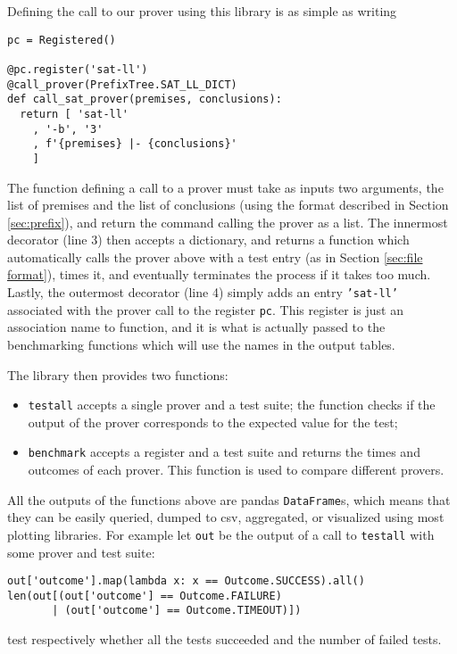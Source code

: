 Defining the call to our prover using this library is as simple as writing
\begin{verbatim}
pc = Registered()

@pc.register('sat-ll')
@call_prover(PrefixTree.SAT_LL_DICT)
def call_sat_prover(premises, conclusions):
  return [ 'sat-ll'
    , '-b', '3'
    , f'{premises} |- {conclusions}'
    ]
\end{verbatim}
The function defining a call to a prover must take as inputs two arguments, the list of premises and the list of conclusions (using the format described in Section \ref{sec:prefix}), and return the command calling the prover as a list.
The innermost decorator (line 3) then accepts a dictionary, and returns a function which automatically calls the prover above with a test entry (as in Section \ref{sec:file format}), times it, and eventually terminates the process if it takes too much.
Lastly, the outermost decorator (line 4) simply adds an entry \texttt{'sat-ll'} associated with the prover call to the register \texttt{pc}.
This register is just an association name to function, and it is what is actually passed to the benchmarking functions which will use the names in the output tables.

The library then provides two functions:
\begin{itemize}
	\item \texttt{testall} accepts a single prover and a test suite; the function checks if the output of the prover corresponds to the expected value for the test;
	\item \texttt{benchmark} accepts a register and a test suite and returns the times and outcomes of each prover.
		This function is used to compare different provers.
\end{itemize}
All the outputs of the functions above are pandas \texttt{DataFrame}s, which means that they can be easily queried, dumped to csv, aggregated, or visualized using most plotting libraries.
For example let \texttt{out} be the output of a call to \texttt{testall} with some prover and test suite:
\begin{verbatim}
out['outcome'].map(lambda x: x == Outcome.SUCCESS).all()
len(out[(out['outcome'] == Outcome.FAILURE) 
       | (out['outcome'] == Outcome.TIMEOUT)])
\end{verbatim}
test respectively whether all the tests succeeded and the number of failed tests.

